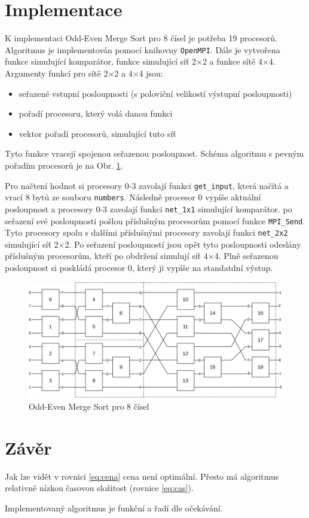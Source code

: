 \documentclass[12pt,a4paper]{article}
\begin{document}
\section{Implementace}
\label{sec:implementace}
K implementaci Odd-Even Merge Sort pro 8 čísel je potřeba 19 procesorů. Algoritmus je implementován pomocí knihovny \texttt{OpenMPI}. Dále je vytvořena funkce simulující komparátor, funkce simulující síť 2$\times$2 a funkce sítě 4$\times$4. Argumenty funkcí pro sítě 2$\times$2 a 4$\times$4 jsou:
\begin{itemize}
     \item seřazené vstupní posloupnosti (s poloviční velikostí výstupní posloupnosti)
     \item pořadí procesoru, který volá danou funkci
     \item vektor pořadí procesorů, simulující tuto síť
 \end{itemize}
Tyto funkce vracejí spojenou seřazenou posloupnost.
Schéma algoritmu s pevným pořadím procesorů je na Obr. \ref{fig:oems}. 

Pro načtení hodnot si procesory 0-3 zavolají funkci \texttt{get\_input}, která načítá a vrací 8 bytů ze souboru \texttt{numbers}. Následně procesor 0 vypíše aktuální posloupnost a procesory 0-3 zavolají funkci \texttt{net\_1x1} simulující komparátor.
po seřazení své posloupnosti pošlou příslušným procesorům pomocí funkce \texttt{MPI\_Send}. Tyto procesory spolu s dalšími příslušnými procesory zavolají funkci \texttt{net\_2x2} simulující síť 2$\times$2. Po seřazení posloupností jsou opět tyto posloupnosti odeslány příslušným procesorům, kteří po obdržení simulují síť 4$\times$4. Plně seřazenou posloupnost si poskládá procesor 0, který ji vypíše na standatdní výstup.

\begin{figure}[H]
    \centering
    \includegraphics[width=\textwidth]{img/oems.png}
    \caption{Odd-Even Merge Sort pro 8 čísel}
    \label{fig:oems}
\end{figure}

\section{Závěr}
\label{sec:závěr}
Jak lze vidět v rovnici \ref{eq:cena} cena není optimální. Přesto má algoritmus relativně nízkou časovou složitost (rovnice \ref{eq:cas}). 

Implementovaný algoritmus je funkční a řadí dle očekávání.
\end{document}
